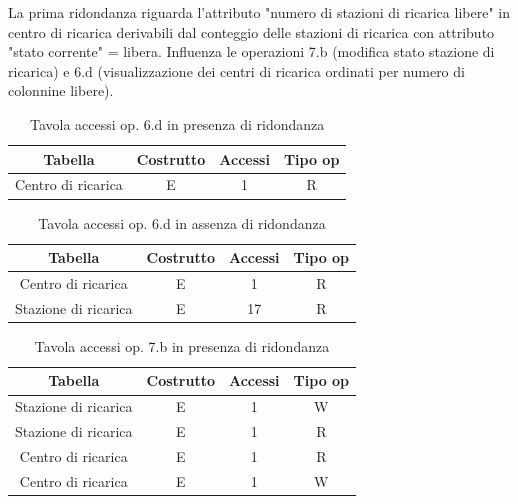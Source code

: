 \documentclass{article}
\begin{document}
La prima ridondanza riguarda l'attributo "numero di stazioni di ricarica libere" in centro di ricarica
derivabili dal conteggio delle stazioni di ricarica con attributo "stato corrente" = libera.
Influenza le operazioni 7.b (modifica stato stazione di ricarica) e 6.d (visualizzazione dei centri di ricarica ordinati per numero di colonnine libere).

\begin{table}[h]
  \centering
  \begin{tabular}{|c|c|c|c|}
    \hline
    Tabella & Costrutto & Accessi & Tipo op \\ \hline
    Centro di ricarica  & E & 1 & R \\ \hline
  \end{tabular}
  \caption{Tavola accessi op. 6.d in presenza di ridondanza}
  \label{tab:label}
\end{table}

\begin{table}[h]
  \centering
  \begin{tabular}{|c|c|c|c|}
    \hline
    Tabella & Costrutto & Accessi & Tipo op \\ \hline
    Centro di ricarica  & E & 1 & R \\ \hline
    Stazione di ricarica & E & 17 & R \\ \hline
  \end{tabular}
  \caption{Tavola accessi op. 6.d in assenza di ridondanza}
  \label{tab:label}
\end{table}

\begin{table}[h]
  \centering
  \begin{tabular}{|c|c|c|c|}
    \hline
    Tabella & Costrutto & Accessi & Tipo op \\ \hline
    Stazione di ricarica  & E & 1 & W \\ \hline 
    Stazione di ricarica  & E & 1 & R \\ \hline %
    Centro di ricarica  & E & 1 & R \\ \hline %
    Centro di ricarica  & E & 1 & W \\ \hline %
  \end{tabular}
  \caption{Tavola accessi op. 7.b in presenza di ridondanza}
  \label{tab:label}
\end{table}
\end{document}
